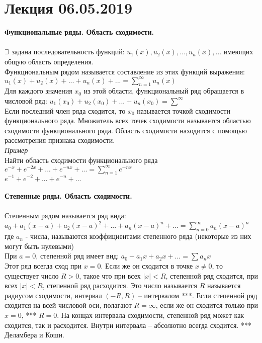 \documentclass{article}
\numberwithin{equation}{section}
\def\letus{%
    \mathord{\setbox0=\hbox{$\exists$}%
             \hbox{\kern 0.125\wd0%
                   \vbox to \ht0{%
                      \hrule width 0.75\wd0%
                      \vfill%
                      \hrule width 0.75\wd0}%
                   \vrule height \ht0%
                   \kern 0.125\wd0}%
           }%
}
\begin{document}
\section{Лекция 06.05.2019}
\textbf{Функциональные ряды. Область сходимости.}
\\\\
$\letus$ задана последовательность функций: $u_1(x),u_2(x),...,u_n(x),...$ имеющих общую область определения.\\
Функциональным рядом называется составление из этих функций выражения: $u_1(x)+u_2(x)+...+u_n(x)+...=\sum\limits_{n=1}^\infty u_n(x)$\\
Для каждого значения $x_0$ из этой области, функциональный ряд обращается в числовой ряд: $u_1(x_0)+u_2(x_0)+...+u_n(x_0)=\sum\limits^\infty$\\
Если последний член ряда сходится, то $x_0$ называется точкой сходимости функционального ряда. Множитель всех точек сходимости называется областью сходимости функционального ряда. Область сходимости находится с помощью рассмотрения признака сходимости.\\
\textit{Пример}\\
Найти область сходимости функционального ряда\\
$e^{-x}+e^{-2x}+...+e^{-nx}+...=\sum\limits_{n=1}^\infty e^{-nx}$\\
$e^{-1}+e^{-2}+...+e^{-n}+...$
\\\\
\textbf{Степенные ряды. Область сходимости.}
\\\\
Степенным рядом называется ряд вида: $a_0+a_1(x-a)+a_2(x-a)^2+...+a_n(x-a)^n+...=\sum\limits_{n=0}^\infty a_n(x-a)^n$\\
где $a_n$ - числа, называются коэффициентами степенного ряда (некоторые из них могут быть нулевыми)\\
При $a=0$, степенной ряд имеет вид: $a_0+a_1x+a_2x+...=\sum\limits a_nx$\\
Этот ряд всегда сход при $x=0$. Если же он сходится в точке $x\neq0$, то существует число $R>0$, такое что при всех $|x|<R$, степенной ряд сходится, при всех $|x|<R$, степенной ряд расходится. Это число называется $R$ называется радиусом сходимости, интервал $(-R,R)$ -- интервалом \colorbox{red!50}{***}. Если степенной ряд сходится на всей числовой оси, полагают $R=\infty$, если же он сходится только при $x=0$, \colorbox{red!50}{***} $R=0$. На концах интервала сходимости, степенной ряд может как сходится, так и расходится. Внутри интервала -- абсолютно всегда сходится. \colorbox{red!50}{***} Деламбера и Коши.
\end{document}
